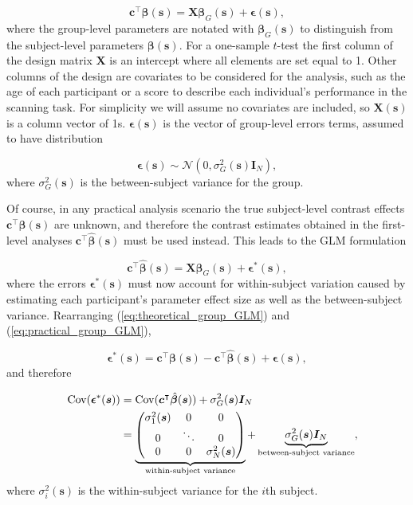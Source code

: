 \begin{equation}
\label{eq:theoretical_group_GLM}
\bm{c}^{\intercal}\bm{\beta}(\bm{s}) = \bm{X}\bm{\beta}_{G}(\bm{s}) + \bm{\epsilon}(\bm{s}),
\end{equation}
where the group-level parameters are notated with $\bm{\beta}_{G}(\bm{s})$ to distinguish from the subject-level parameters $\bm{\beta}(\bm{s})$. For a one-sample $t$-test the first column of the design matrix $\bm{X}$ is an intercept where all elements are set equal to 1. Other columns of the design are covariates to be considered for the analysis, such as the age of each participant or a score to describe each individual's performance in the scanning task. For simplicity we will assume no covariates are included, so $\bm{X}(\bm{s})$ is a column vector of 1s. $\bm{\epsilon}(\bm{s})$ is the vector of group-level errors terms, assumed to have distribution

\begin{equation}
\label{eq:group_errors}
\bm{\epsilon}(\bm{s}) \sim  \mathcal{N}(0, \sigma_{G}^{2}(\bm{s})\bm{I}_{N}),
\end{equation}
where $\sigma_{G}^{2}(\bm{s})$ is the between-subject variance for the group. 

Of course, in any practical analysis scenario the true subject-level contrast effects $\bm{c}^{\intercal}\bm{\beta}(\bm{s})$ are unknown, and therefore the contrast estimates obtained in the first-level analyses $\bm{c}^{\intercal}\hat{\bm{\beta}}(\bm{s})$ must be used instead. This leads to the GLM formulation

\begin{equation} 
\label{eq:practical_group_GLM}
\bm{c}^{\intercal}\hat{\bm{\beta}}(\bm{s}) = \bm{X}\bm{\beta}_{G}(\bm{s}) + \bm{\epsilon}^{*}(\bm{s}),
\end{equation}
where the errors $\bm{\epsilon}^{*}(\bm{s})$ must now account for within-subject variation caused by estimating each participant's parameter effect size as well as the between-subject variance. Rearranging (\ref{eq:theoretical_group_GLM}) and (\ref{eq:practical_group_GLM}), 

\begin{equation} 
\label{eq:practical_group_errors}
\bm{\epsilon}^{*}(\bm{s}) = \bm{c}^{\intercal}\bm{\beta}(\bm{s}) - \bm{c}^{\intercal}\hat{\bm{\beta}}(\bm{s}) + \bm{\epsilon}(\bm{s}),
\end{equation}
and therefore

\begin{alignat}{4}
\label{group_error_covariance}
&&\mathrm{Cov}(\bm{\epsilon}^{*}(\bm{s}))
&= \mathrm{Cov}(\bm{c}^{\intercal}\hat{\bm{\beta}}(\bm{s})) + \sigma_{G}^{2}(\bm{s})\bm{I}_{N} \notag\\
&
&
&= \underbrace{\begin{pmatrix}
\sigma_{1}^{2}(\bm{s}) & 0 & 0 \\
0 & \ddots & 0 \\
0 & 0 & \sigma_{N}^{2}(\bm{s})
\end{pmatrix}}_{\text{within-subject variance}}
+ \underbrace{\sigma_{G}^{2}(\bm{s})\bm{I}_{N}}_{\text{between-subject variance}},
\end{alignat}
where $\sigma_{i}^{2}(\bm{s})$ is the within-subject variance for the $i$th subject. 

